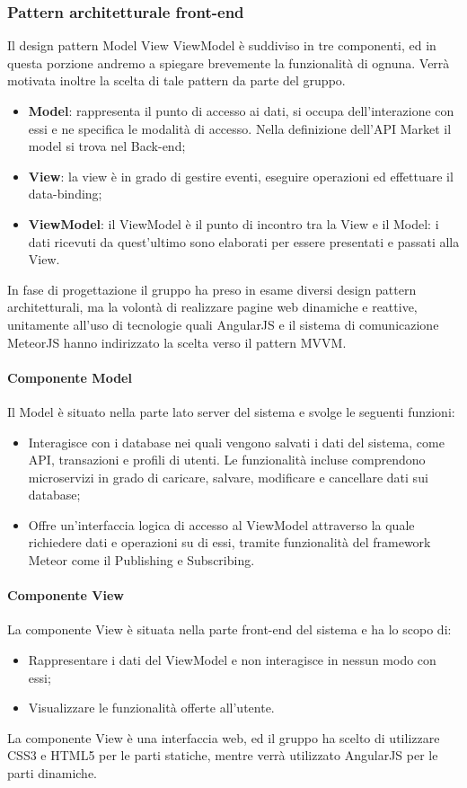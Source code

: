 \subsubsection{Pattern architetturale front-end}
Il design pattern Model View ViewModel è suddiviso in tre componenti, ed in questa porzione andremo a spiegare brevemente la funzionalità di ognuna. Verrà motivata inoltre la scelta di tale pattern da parte del gruppo.

\begin{itemize}
	\item \textbf{Model}: rappresenta il punto di accesso ai dati, si occupa dell'interazione con essi e ne specifica le modalità di accesso. Nella definizione dell'API Market il model si trova nel Back-end;
	\item \textbf{View}: la view è in grado di gestire eventi, eseguire operazioni ed effettuare il data-binding;
	\item \textbf{ViewModel}: il ViewModel è  il punto di incontro tra la View e il Model: i dati ricevuti da quest’ultimo sono elaborati per essere presentati e passati alla View.
\end{itemize}

In fase di progettazione il gruppo ha preso in esame diversi design pattern architetturali, ma la volontà di realizzare pagine web dinamiche e reattive, unitamente all'uso di tecnologie quali AngularJS e il sistema di comunicazione MeteorJS hanno indirizzato la scelta verso il pattern MVVM.

\paragraph{Componente Model}
Il Model è situato nella parte lato server del sistema e svolge le seguenti funzioni:
\begin{itemize}
	\item Interagisce con i database nei quali vengono salvati i dati del sistema, come API, transazioni e profili di utenti. Le funzionalità incluse comprendono microservizi in grado di caricare, salvare, modificare e cancellare dati sui database;
	\item Offre un'interfaccia logica di accesso al ViewModel attraverso la quale richiedere dati e operazioni su di essi, tramite funzionalità del framework Meteor come il Publishing e Subscribing.
\end{itemize}
\paragraph{Componente View}
La componente View è situata nella parte front-end del sistema e ha lo scopo di:
\begin{itemize}
	\item Rappresentare i dati del ViewModel e non interagisce in nessun modo con essi;
	\item Visualizzare le funzionalità offerte all'utente.
\end{itemize} 
La componente View è una interfaccia web, ed il gruppo ha scelto di utilizzare CSS3 e HTML5 per le parti statiche, mentre verrà utilizzato AngularJS per le parti dinamiche. 
